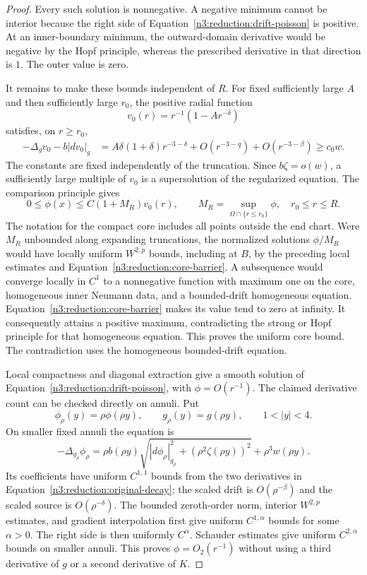 \begin{proof}
Every such solution is nonnegative.  A negative minimum cannot be
interior because the right side of
Equation~\eqref{n3:reduction:drift-poisson} is positive.  At an inner-boundary
minimum, the outward-domain derivative would be negative by the Hopf
principle, whereas the prescribed derivative in that direction is $1$.
The outer value is zero.

It remains to make these bounds independent of $R$.  For fixed sufficiently large
$A$ and then sufficiently large $r_0$, the positive radial function
\[
 v_0(r)=r^{-1}(1-Ar^{-\delta})
\]
satisfies, on $r\ge r_0$,
\begin{align*}
 -\Delta_gv_0-b|dv_0|_g
 &=A\delta(1+\delta)r^{-3-\delta}
       +O(r^{-3-q})+O(r^{-3-\beta})\ge c_0w.
\end{align*}
The constants are fixed independently of the truncation.  Since
$b\zeta=o(w)$, a sufficiently large multiple of $v_0$ is a supersolution
of the regularized equation.  The comparison principle gives
\begin{equation}
 \label{n3:reduction:core-barrier}
 0\le\phi(x)\le C(1+M_R)v_0(r),\qquad
 M_R=\sup_{\Omega\cap\{r\le r_0\}}\phi,
 \quad r_0\le r\le R.
\end{equation}
The notation for the compact core includes all points outside the end
chart.  Were $M_R$ unbounded along expanding truncations, the normalized
solutions $\phi/M_R$ would have locally uniform $W^{2,p}$ bounds, including
at $B$, by the preceding local estimates and
Equation~\eqref{n3:reduction:core-barrier}.  A subsequence would converge
locally in $C^1$ to a nonnegative function with maximum one on the core,
homogeneous inner Neumann data, and a bounded-drift homogeneous equation.
Equation~\eqref{n3:reduction:core-barrier} makes its value tend to zero at
infinity.  It consequently attains a positive maximum, contradicting the
strong or Hopf principle for that homogeneous equation.  This proves the
uniform core bound.  The contradiction uses the homogeneous bounded-drift
equation.

Local compactness and diagonal extraction give a smooth solution of
Equation~\eqref{n3:reduction:drift-poisson}, with $\phi=O(r^{-1})$.
The claimed derivative count can be checked directly on annuli.  Put
\[
 \phi_{\rho}(y)=\rho\phi(\rho y),\qquad
 g_{\rho}(y)=g(\rho y),\qquad 1<|y|<4.
\]
On smaller fixed annuli the equation is
\[
 -\Delta_{g_{\rho}}\phi_{\rho}
 =\rho b(\rho y)
       \sqrt{|d\phi_{\rho}|_{g_{\rho}}^2+
                     (\rho^2\zeta(\rho y))^2}
       +\rho^3w(\rho y).
\]
Its coefficients have uniform $C^{1,1}$ bounds from the two derivatives
in Equation~\eqref{n3:reduction:original-decay}; the scaled drift is
$O(\rho^{-\beta})$ and the scaled source is $O(\rho^{-\delta})$.
The bounded zeroth-order norm, interior $W^{2,p}$ estimates, and gradient
interpolation first give uniform $C^{1,\alpha}$ bounds for some
$\alpha>0$.  The right side is then uniformly $C^\alpha$.  Schauder
estimates give uniform $C^{2,\alpha}$ bounds on smaller annuli.  This
proves $\phi=O_2(r^{-1})$ without using a third derivative of $g$ or a
second derivative of $K$.


\end{proof}
